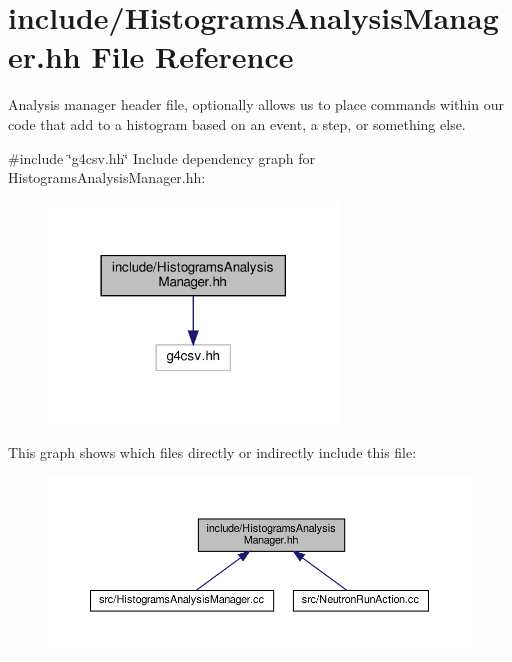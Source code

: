 \hypertarget{HistogramsAnalysisManager_8hh}{}\section{include/\+Histograms\+Analysis\+Manager.hh File Reference}
\label{HistogramsAnalysisManager_8hh}


Analysis manager header file, optionally allows us to place commands within our code that add to a histogram based on an event, a step, or something else.  


{\ttfamily \#include \char`\"{}g4csv.\+hh\char`\"{}}\newline
Include dependency graph for Histograms\+Analysis\+Manager.\+hh\+:
\nopagebreak
\begin{figure}[H]
\begin{center}
\leavevmode
\includegraphics[width=218pt]{HistogramsAnalysisManager_8hh__incl}
\end{center}
\end{figure}
This graph shows which files directly or indirectly include this file\+:
\nopagebreak
\begin{figure}[H]
\begin{center}
\leavevmode
\includegraphics[width=350pt]{HistogramsAnalysisManager_8hh__dep__incl}
\end{center}
\end{figure}
